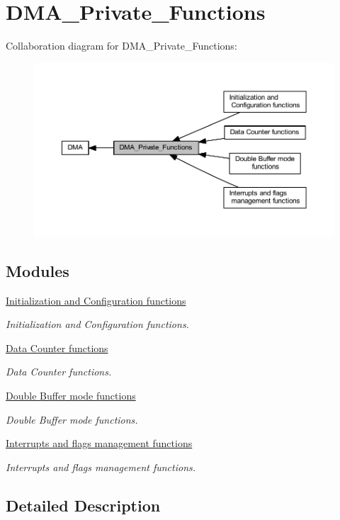 \hypertarget{group___d_m_a___private___functions}{}\section{D\+M\+A\+\_\+\+Private\+\_\+\+Functions}
\label{group___d_m_a___private___functions}
Collaboration diagram for D\+M\+A\+\_\+\+Private\+\_\+\+Functions\+:\nopagebreak
\begin{figure}[H]
\begin{center}
\leavevmode
\includegraphics[width=350pt]{group___d_m_a___private___functions}
\end{center}
\end{figure}
\subsection*{Modules}
\begin{DoxyCompactItemize}
\item 
\hyperlink{group___d_m_a___group1}{Initialization and Configuration functions}
\begin{DoxyCompactList}\small\item\em Initialization and Configuration functions. \end{DoxyCompactList}\item 
\hyperlink{group___d_m_a___group2}{Data Counter functions}
\begin{DoxyCompactList}\small\item\em Data Counter functions. \end{DoxyCompactList}\item 
\hyperlink{group___d_m_a___group3}{Double Buffer mode functions}
\begin{DoxyCompactList}\small\item\em Double Buffer mode functions. \end{DoxyCompactList}\item 
\hyperlink{group___d_m_a___group4}{Interrupts and flags management functions}
\begin{DoxyCompactList}\small\item\em Interrupts and flags management functions. \end{DoxyCompactList}\end{DoxyCompactItemize}


\subsection{Detailed Description}
